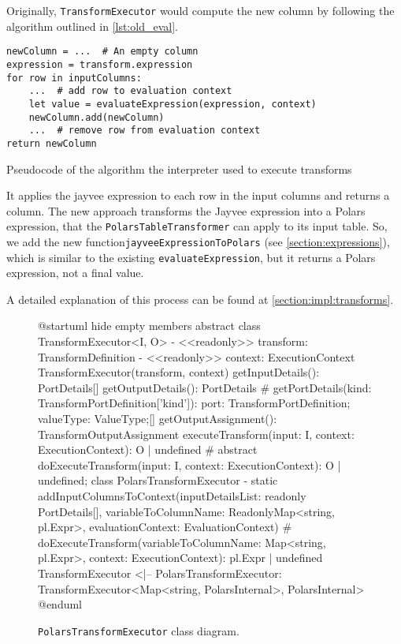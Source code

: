 Originally, \Verb|TransformExecutor| would compute the new column by following the algorithm outlined in \ref{lst:old_eval}.
\begin{listing}
	\begin{verbatim}
newColumn = ...  # An empty column
expression = transform.expression
for row in inputColumns:
	...  # add row to evaluation context
	let value = evaluateExpression(expression, context)
	newColumn.add(newColumn)
	...  # remove row from evaluation context
return newColumn
	\end{verbatim}
	\caption{Pseudocode of the algorithm the interpreter used to execute transforms}
	\label{lst:old_eval}
\end{listing}
It applies the jayvee expression to each row in the input columns and returns a column.
The new approach transforms the Jayvee expression into a Polars expression, that the \Verb|PolarsTableTransformer| can apply to its input table.
So, we add the new function\Verb|jayveeExpressionToPolars| (see \ref{section:expressions}), which is similar to the existing \Verb|evaluateExpression|, but it returns a Polars expression, not a final value.

A detailed explanation of this process can be found at \ref{section:impl:transforms}.

\begin{figure}
	\begin{plantuml}
		@startuml
		hide empty members
		abstract class TransformExecutor<I, O> {
		- <<readonly>> transform: TransformDefinition
		- <<readonly>> context: ExecutionContext
		TransformExecutor(transform, context)
		getInputDetails(): PortDetails[]
		getOutputDetails(): PortDetails
		# getPortDetails(kind: TransformPortDefinition['kind']): { port: TransformPortDefinition; valueType: ValueType;}[]
		getOutputAssignment(): TransformOutputAssignment
		executeTransform(input: I, context: ExecutionContext): O | undefined
		# {abstract} doExecuteTransform(input: I, context: ExecutionContext): O | undefined;
		}
		class PolarsTransformExecutor  {
		- {static} addInputColumnsToContext(inputDetailsList: readonly PortDetails[], variableToColumnName: ReadonlyMap<string, pl.Expr>, evaluationContext: EvaluationContext)
		# doExecuteTransform(variableToColumnName: Map<string, pl.Expr>, context: ExecutionContext): pl.Expr | undefined
		}
		TransformExecutor <|-- PolarsTransformExecutor: TransformExecutor<Map<string, PolarsInternal>, PolarsInternal>
		@enduml
	\end{plantuml}
	\caption{\Verb|PolarsTransformExecutor| class diagram.}
	\label{fig:uml:transformexecutor}
\end{figure}

